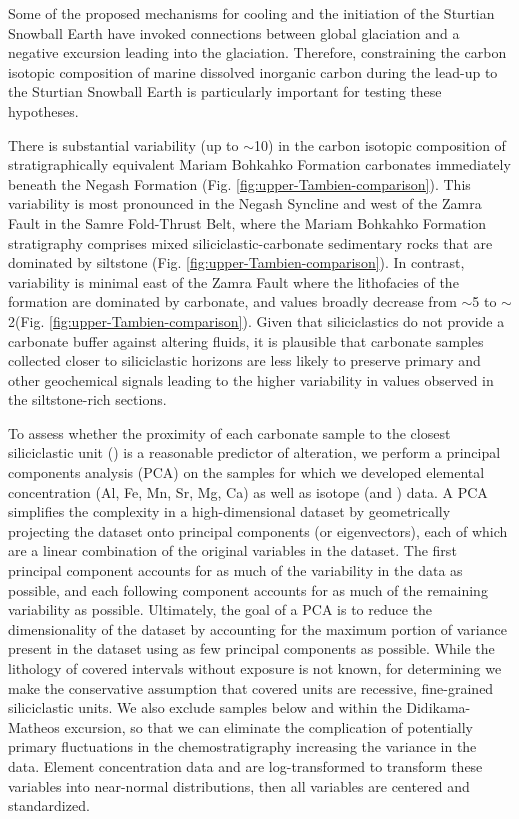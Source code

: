 Some of the proposed mechanisms for cooling and the initiation of the Sturtian Snowball Earth have invoked connections between global glaciation and a negative \dC excursion leading into the glaciation. Therefore, constraining the carbon isotopic composition of marine dissolved inorganic carbon during the lead-up to the Sturtian Snowball Earth is particularly important for testing these hypotheses.

There is substantial variability (up to $\sim$10\permil) in the carbon isotopic composition of stratigraphically equivalent Mariam Bohkahko Formation carbonates immediately beneath the Negash Formation (Fig. \ref{fig:upper-Tambien-comparison}). This variability is most pronounced in the Negash Syncline and west of the Zamra Fault in the Samre Fold-Thrust Belt, where the Mariam Bohkahko Formation stratigraphy comprises mixed siliciclastic-carbonate sedimentary rocks that are dominated by siltstone (Fig. \ref{fig:upper-Tambien-comparison}). In contrast, \dC variability is minimal east of the Zamra Fault where the lithofacies of the formation are dominated by carbonate, and \dC values broadly decrease from $\sim$5 to $\sim$2\permil (Fig. \ref{fig:upper-Tambien-comparison}). Given that siliciclastics do not provide a carbonate buffer against altering fluids, it is plausible that carbonate samples collected closer to siliciclastic horizons are less likely to preserve primary \dC and other geochemical signals leading to the higher variability in \dC values observed in the siltstone-rich sections.

To assess whether the proximity of each carbonate sample to the closest siliciclastic unit (\dsil) is a reasonable predictor of \dC alteration, we perform a principal components analysis (PCA) on the samples for which we developed elemental concentration (Al, Fe, Mn, Sr, Mg, Ca) as well as isotope (\dC and \dO) data. A PCA simplifies the complexity in a high-dimensional dataset by geometrically projecting the dataset onto principal components (or eigenvectors), each of which are a linear combination of the original variables in the dataset. The first principal component accounts for as much of the variability in the data as possible, and each following component accounts for as much of the remaining variability as possible. Ultimately, the goal of a PCA is to reduce the dimensionality of the dataset by accounting for the maximum portion of variance present in the dataset using as few principal components as possible. While the lithology of covered intervals without exposure is not known, for determining \dsil we make the conservative assumption that covered units are recessive, fine-grained siliciclastic units. We also exclude samples below and within the Didikama-Matheos excursion, so that we can eliminate the complication of potentially primary fluctuations in the \dC chemostratigraphy increasing the variance in the data. Element concentration data and \dsil are log-transformed to transform these variables into near-normal distributions, then all variables are centered and standardized.

